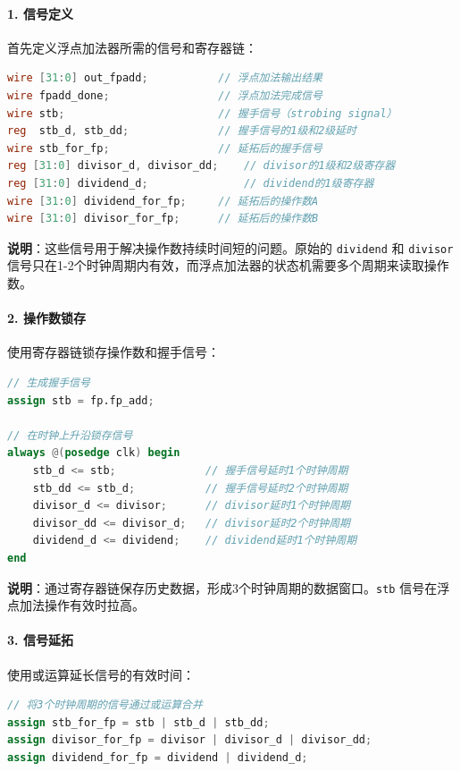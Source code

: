 \documentclass[12pt,a4paper]{article}
\begin{document}
\paragraph{1. 信号定义}

首先定义浮点加法器所需的信号和寄存器链：

\begin{lstlisting}[language=Verilog]
wire [31:0] out_fpadd;           // 浮点加法输出结果
wire fpadd_done;                 // 浮点加法完成信号
wire stb;                        // 握手信号（strobing signal）
reg  stb_d, stb_dd;              // 握手信号的1级和2级延时
wire stb_for_fp;                 // 延拓后的握手信号
reg [31:0] divisor_d, divisor_dd;    // divisor的1级和2级寄存器
reg [31:0] dividend_d;               // dividend的1级寄存器
wire [31:0] dividend_for_fp;     // 延拓后的操作数A
wire [31:0] divisor_for_fp;      // 延拓后的操作数B
\end{lstlisting}

\textbf{说明}：这些信号用于解决操作数持续时间短的问题。原始的 \texttt{dividend} 和 \texttt{divisor} 信号只在1-2个时钟周期内有效，而浮点加法器的状态机需要多个周期来读取操作数。

\paragraph{2. 操作数锁存}

使用寄存器链锁存操作数和握手信号：

\begin{lstlisting}[language=Verilog]
// 生成握手信号
assign stb = fp.fp_add;

// 在时钟上升沿锁存信号
always @(posedge clk) begin
    stb_d <= stb;              // 握手信号延时1个时钟周期
    stb_dd <= stb_d;           // 握手信号延时2个时钟周期
    divisor_d <= divisor;      // divisor延时1个时钟周期
    divisor_dd <= divisor_d;   // divisor延时2个时钟周期
    dividend_d <= dividend;    // dividend延时1个时钟周期
end
\end{lstlisting}

\textbf{说明}：通过寄存器链保存历史数据，形成3个时钟周期的数据窗口。\texttt{stb} 信号在浮点加法操作有效时拉高。

\paragraph{3. 信号延拓}

使用或运算延长信号的有效时间：

\begin{lstlisting}[language=Verilog]
// 将3个时钟周期的信号通过或运算合并
assign stb_for_fp = stb | stb_d | stb_dd;
assign divisor_for_fp = divisor | divisor_d | divisor_dd;
assign dividend_for_fp = dividend | dividend_d;
\end{lstlisting}
\end{document}
